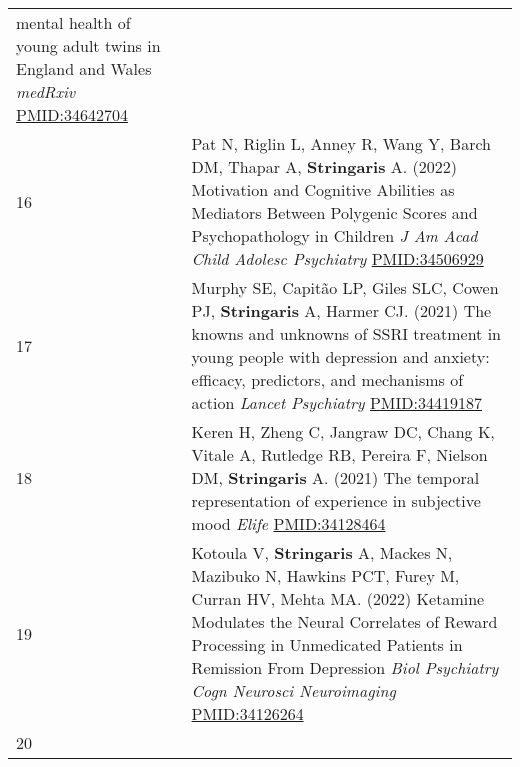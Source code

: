 \documentclass[
]{article}
\begin{document}
\begin{longtable}[]{@{}ll@{}}
\begin{minipage}[t]{0.94\columnwidth}
mental health of young adult twins in England and Wales \emph{medRxiv}
\url{PMID:34642704}\strut
\end{minipage}\tabularnewline
\begin{minipage}[t]{0.01\columnwidth}\raggedright
16\strut
\end{minipage} & \begin{minipage}[t]{0.94\columnwidth}\raggedright
Pat N, Riglin L, Anney R, Wang Y, Barch DM, Thapar A,
\textbf{Stringaris} A. (2022) Motivation and Cognitive Abilities as
Mediators Between Polygenic Scores and Psychopathology in Children
\emph{J Am Acad Child Adolesc Psychiatry} \url{PMID:34506929}\strut
\end{minipage}\tabularnewline
\begin{minipage}[t]{0.01\columnwidth}\raggedright
17\strut
\end{minipage} & \begin{minipage}[t]{0.94\columnwidth}\raggedright
Murphy SE, Capitão LP, Giles SLC, Cowen PJ, \textbf{Stringaris} A,
Harmer CJ. (2021) The knowns and unknowns of SSRI treatment in young
people with depression and anxiety: efficacy, predictors, and mechanisms
of action \emph{Lancet Psychiatry} \url{PMID:34419187}\strut
\end{minipage}\tabularnewline
\begin{minipage}[t]{0.01\columnwidth}\raggedright
18\strut
\end{minipage} & \begin{minipage}[t]{0.94\columnwidth}\raggedright
Keren H, Zheng C, Jangraw DC, Chang K, Vitale A, Rutledge RB, Pereira F,
Nielson DM, \textbf{Stringaris} A. (2021) The temporal representation of
experience in subjective mood \emph{Elife} \url{PMID:34128464}\strut
\end{minipage}\tabularnewline
\begin{minipage}[t]{0.01\columnwidth}\raggedright
19\strut
\end{minipage} & \begin{minipage}[t]{0.94\columnwidth}\raggedright
Kotoula V, \textbf{Stringaris} A, Mackes N, Mazibuko N, Hawkins PCT,
Furey M, Curran HV, Mehta MA. (2022) Ketamine Modulates the Neural
Correlates of Reward Processing in Unmedicated Patients in Remission
From Depression \emph{Biol Psychiatry Cogn Neurosci Neuroimaging}
\url{PMID:34126264}\strut
\end{minipage}\tabularnewline
\begin{minipage}[t]{0.01\columnwidth}\raggedright
20\strut
\end{minipage} & \begin{minipage}[t]{0.94\columnwidth}\raggedright

\end{minipage}
\end{longtable}
\end{document}
